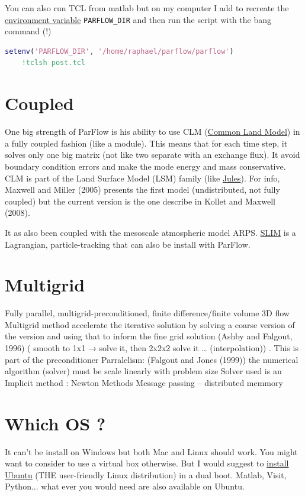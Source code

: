 \documentclass[11pt,a4paper]{report}
\begin{document}
You can also run TCL from matlab but on my computer I add to recreate the \href{https://en.wikipedia.org/wiki/Environment_variable}{environment variable} \verb$PARFLOW_DIR$ and then run the script with the bang command (!)
\begin{lstlisting}[language=matlab]
    setenv('PARFLOW_DIR', '/home/raphael/parflow/parflow')
    !tclsh post.tcl
\end{lstlisting}

\section{Coupled}
One big strength of ParFlow is his ability to use CLM (\href{http://www.cesm.ucar.edu/models/cesm1.0/clm/CLM4_Tech_Note.pdf}{Common Land Model}) in a fully coupled fashion (like a module). This means that for each time step, it solves only one big matrix (not like two separate with an exchange flux). It avoid boundary condition errors and make the mode energy and mass conservative. CLM is part of the Land Surface Model (LSM) family (like \href{https://jules.jchmr.org/}{Jules}).
For info, Maxwell and Miller (2005) presents the first model (undistributed, not fully coupled) but the current version is the one describe in Kollet and Maxwell (2008).

It as also been coupled with the mesoscale atmospheric model ARPS. \href{http://igwmc.mines.edu/about/GWMI2010-01.pdf}{SLIM} is a Lagrangian, particle-tracking that can also be install with ParFlow.

\section{Multigrid}
Fully parallel, multigrid-preconditioned, finite difference/finite volume 3D flow
Multigrid method accelerate  the iterative solution by solving a coarse version of the version and using that to inform the fine grid solution (Ashby and Falgout, 1996) ( smooth to 1x1 → solve it, then 2x2x2 solve it … (interpolation)) . This is part of the preconditioner
Parralelism: (Falgout and Jones (1999))
the numerical algorithm (solver) must be scale linearly with problem size
Solver used is an Implicit method : Newton Methods 
Message passing – distributed memmory

\section{Which OS ?}
It can't be install on Windows but both Mac and Linux should work. You might want to consider to use a virtual box otherwise. But I would suggest to \href{http://www.everydaylinuxuser.com/2014/05/install-ubuntu-1404-alongside-windows.html}{install Ubuntu} (THE user-friendly Linux distribution) in a dual boot. Matlab, Visit, Python... what ever you would need are also available on Ubuntu.
\end{document}
